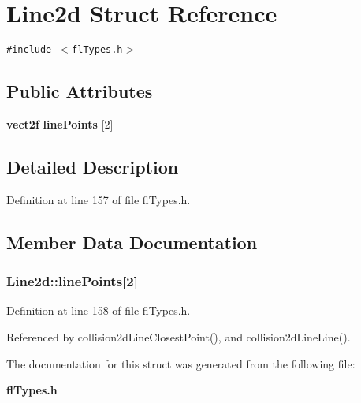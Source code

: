 \section{Line2d Struct Reference}
\label{structLine2d}
{\tt \#include $<$fl\-Types.h$>$}

\subsection*{Public Attributes}
\begin{CompactItemize}
\item 
{\bf vect2f} {\bf line\-Points} [2]
\end{CompactItemize}


\subsection{Detailed Description}




Definition at line 157 of file fl\-Types.h.

\subsection{Member Data Documentation}
\subsubsection{ {\bf Line2d::line\-Points}[2]}\label{structLine2d_731770e7b93f889cd99b5dbdce478ce0}




Definition at line 158 of file fl\-Types.h.

Referenced by collision2d\-Line\-Closest\-Point(), and collision2d\-Line\-Line().

The documentation for this struct was generated from the following file:\begin{CompactItemize}
\item 
{\bf fl\-Types.h}\end{CompactItemize}
